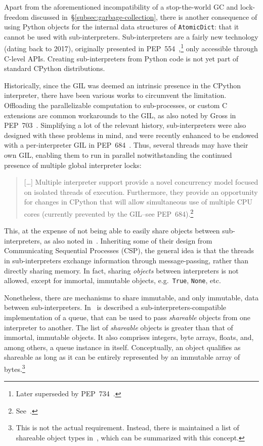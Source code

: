 Apart from the aforementioned incompatibility of a stop-the-world GC and lock-freedom discussed in~\S\ref{subsec:garbage-collection}, there is another consequence of using Python objects for the internal data structures of \texttt{AtomicDict}: that it cannot be used with sub-interpreters.
Sub-interpreters are a fairly new technology (dating back to 2017), originally presented in PEP~554~\cite{pep554},\footnote{%
    Later superseded by PEP~734~\cite{pep734}.
} only accessible through C-level APIs.
Creating sub-interpreters from Python code is not yet part of standard CPython distributions.

Historically, since the GIL was deemed an intrinsic presence in the CPython interpreter, there have been various works to circumvent the limitation.
Offloading the parallelizable computation to sub-processes, or custom C extensions are common workarounds to the GIL, as also noted by Gross in PEP~703~\cite{pep703}.
Simplifying a lot of the relevant history, sub-interpreters were also designed with these problems in mind, and were recently enhanced to be endowed with a per-interpreter GIL in PEP~684~\cite{pep684}.
Thus, several threads may have their own GIL, enabling them to run in parallel notwithstanding the continued presence of multiple global interpreter locks:
\begin{quote}
    [\ldots] Multiple interpreter support provide a novel concurrency model focused on isolated threads of execution.
    Furthermore, they provide an opportunity for changes in CPython that will allow simultaneous use of multiple CPU cores (currently prevented by the GIL--see PEP~684).\footnote{See~\cite{pep554}.}
\end{quote}

This, at the expense of not being able to easily share objects between sub-interpreters, as also noted in~\cite[\S~Per-Interpreter GIL]{pep703}.
Inheriting some of their design from Communicating Sequential Processes (CSP), the general idea is that the threads in sub-interpreters exchange information through message-passing, rather than directly sharing memory.
In fact, sharing \emph{objects} between interpreters is not allowed, except for immortal, immutable objects, e.g.\ \texttt{True}, \texttt{None}, etc.

Nonetheless, there are mechanisms to share immutable, and only immutable, data between sub-interpreters.
In~\cite[\S Queue Objects]{pep734} is described a sub-interpreters-compatible implementation of a queue, that can be used to pass \emph{shareable} objects from one interpreter to another.
The list of \emph{shareable} objects is greater than that of immortal, immutable objects.
It also comprises integers, byte arrays, floats, and, among others, a queue instance in itself.
Conceptually, an object qualifies as shareable as long as it can be entirely represented by an immutable array of bytes.\footnote{%
    This is not the actual requirement.
    Instead, there is maintained a list of shareable object types in~\cite[\S Shareable Objects]{pep734}, which can be summarized with this concept.
}

